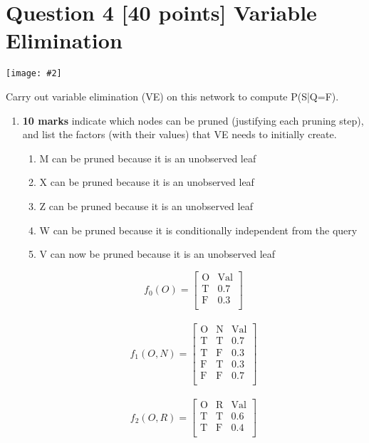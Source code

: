 \documentclass{article}
\def\ans#1{{\color{ans}#1}}
\newcommand{\mat}[1]{\begin{bmatrix}#1\end{bmatrix}}
\newcommand{\centerfig}[2]{\begin{center}\texttt{[image: \#2]}\end{center}}
\begin{document}
\section{Question 4 [40 points] Variable Elimination}
\centerfig{1}{../figs/fig3}
Carry out variable elimination (VE) on this network to compute P(S|Q=F). \\
\begin{enumerate}[label=\arabic*.]
    \item \textbf{10 marks} indicate which nodes can be pruned (justifying each pruning step), and list the factors (with their values) that VE needs to initially create.
    \ans{
        \begin{enumerate}[label=\arabic*.]
            \item M can be pruned because it is an unobserved leaf
            \item X can be pruned because it is an unobserved leaf
            \item Z can be pruned because it is an unobserved leaf
            \item W can be pruned because it is conditionally independent from the query
            \item V can now be pruned because it is an unobserved leaf
        \end{enumerate}
    }
    \ans{
    		\[
                f_0(O) = \mat{
                    \text{O}& \text{Val} \\
                    \text{T} & 0.7 \\
                    \text{F} & 0.3 \\
                }
            \]
            \\
            \[
                f_1(O,N) = \mat{
                    \text{O} & \text{N} & \text{Val} \\
                    \text{T} & \text{T} & 0.7 \\
                    \text{T} & \text{F} & 0.3 \\
                    \text{F} & \text{T} & 0.3 \\
                    \text{F} & \text{F} & 0.7 \\
                }
            \]			\\
            \[
                f_2(O,R) = \mat{
                    \text{O} & \text{R} & \text{Val} \\
                    \text{T} & \text{T} & 0.6 \\
                    \text{T} & \text{F} & 0.4 \\
}\]}
\end{enumerate}
\end{document}
